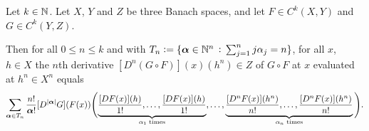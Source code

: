   \begin{theorem}[Fa\'{a} di Bruno]
    Let $k\in\mathbb{N}$.
  Let $X$, $Y$ and $Z$ be three Banach spaces, and let
  $F\in C^k(X,Y)$ and $G\in C^k(Y,Z)$.

  Then for all $0\le n\le k$ and with
  $T_n := \{{\boldsymbol \alpha} \in\mathbb{N}^n\, :\,\sum_{j=1}^n j\alpha_j =
    n \}$, %
  for all $x$, $h\in X$ the $n$th derivative
  $[D^n(G\circ F)](x)(h^n)\in Z$ of $G\circ F$ at $x$ evaluated at
  $h^n\in X^n$ equals
  \begin{equation*}
     \sum_{\bsalpha\in T_n}%
    \frac{n!}{\bsalpha!}
    [D^{|\bsalpha|}G](F(x)) \Bigg(\smash[b]{\underbrace{\frac{[DF(x)](h)}{1!},\ldots, \frac{[DF(x)](h)}{1!}}_{\text{$\alpha_1$ times}}},\ldots,\underbrace{\frac{[D^{n}F(x)](h^n)}{n!},\ldots, \frac{[D^{n}F(x)](h^n)}{n!}}_{\text{$\alpha_n$ times}}\Bigg).
  \end{equation*}

\end{theorem}
